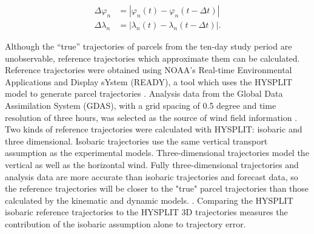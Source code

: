 \begin{align}
    \Delta \varphi_n &= | \varphi_n (t) - \varphi_n (t - \Delta t) | \\
    \Delta \lambda_n &= |\lambda_n (t) - \lambda_n (t - \Delta t)|.
\end{align}

Although the ``true'' trajectories of parcels from the ten-day study period are unobservable, reference trajectories which approximate them can be calculated.
Reference trajectories were obtained using NOAA's Real-time Environmental Applications and Display sYstem (READY), a tool which uses the HYSPLIT model to generate parcel trajectories \cite{rolph_real-time_2017}.
Analysis data from the Global Data Assimilation System (GDAS), with a grid spacing of 0.5 degree and time resolution of three hours, was selected as the source of wind field information \cite{noaa_global_2004}.
Two kinds of reference trajectories were calculated with HYSPLIT: isobaric and three dimensional.
Isobaric trajectories use the same vertical transport assumption as the experimental models. 
Three-dimensional trajectories model the vertical as well as the horizontal wind.
Fully three-dimensional trajectories and analysis data are more accurate than isobaric trajectories and forecast data, 
so the reference trajectories will be closer to the "true" parcel trajectories than those calculated by the kinematic and dynamic models.  \cite{stohl_computation_1998}.
Comparing the HYSPLIT isobaric reference trajectories to the HYSPLIT 3D trajectories measures the contribution of the isobaric assumption alone to trajectory error.
  
